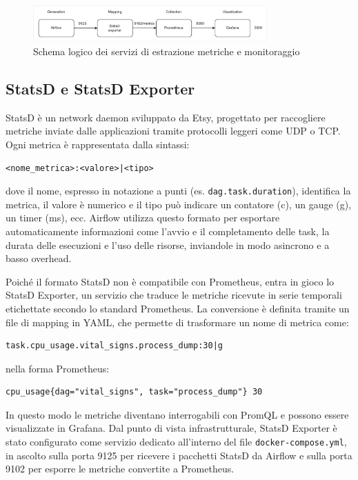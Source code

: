 \begin{figure}[h]
    \centering
    \includegraphics[width=0.8\textwidth]{img/monitoraggioschema.drawio.pdf}
    \caption{Schema logico dei servizi di estrazione metriche e monitoraggio}
    \label{fig:monitoring_schema}
\end{figure}

\subsection{StatsD e StatsD Exporter}
\label{sec:statsd}

StatsD è un network daemon sviluppato da Etsy, progettato per raccogliere metriche inviate dalle applicazioni tramite protocolli leggeri come UDP o TCP. Ogni metrica è rappresentata dalla sintassi:

\begin{verbatim}
<nome_metrica>:<valore>|<tipo>
\end{verbatim}

dove il nome, espresso in notazione a punti (es. \texttt{dag.task.duration}), identifica la metrica, il valore è numerico e il tipo può indicare un contatore (c), un gauge (g), un timer (ms), ecc. Airflow utilizza questo formato per esportare automaticamente informazioni come l’avvio e il completamento delle task, la durata delle esecuzioni e l’uso delle risorse, inviandole in modo asincrono e a basso overhead.

Poiché il formato StatsD non è compatibile con Prometheus, entra in gioco lo StatsD Exporter, un servizio che traduce le metriche ricevute in serie temporali etichettate secondo lo standard Prometheus. La conversione è definita tramite un file di mapping in YAML, che permette di trasformare un nome di metrica come:

\begin{verbatim}
task.cpu_usage.vital_signs.process_dump:30|g
\end{verbatim}

nella forma Prometheus:

\begin{verbatim}
cpu_usage{dag="vital_signs", task="process_dump"} 30
\end{verbatim}

In questo modo le metriche diventano interrogabili con PromQL e possono essere visualizzate in Grafana. Dal punto di vista infrastrutturale, StatsD Exporter è stato configurato come servizio dedicato all'interno del file \texttt{docker-compose.yml}, in ascolto sulla porta 9125 per ricevere i pacchetti StatsD da Airflow e sulla porta 9102 per esporre le metriche convertite a Prometheus.


